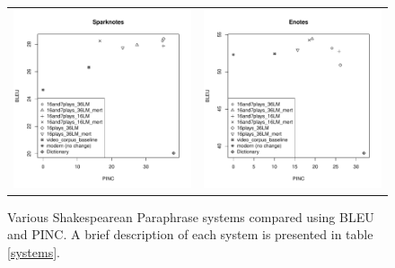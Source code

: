 \documentclass[10pt,a5paper,twoside]{article}
\begin{document}
\begin{figure}
  \begin{center}
    \begin{tabular}{cc}
      \includegraphics[width=2.4in]{figures/bleupinc1.pdf} & \includegraphics[width=2.4in]{figures/bleupinc2.pdf} \\
    \end{tabular}
  \end{center}
  \caption{Various Shakespearean Paraphrase systems compared using BLEU and PINC.  A brief description of each system is presented in table \ref{systems}.}
  \label{bleupinc}
\end{figure}
\end{document}
